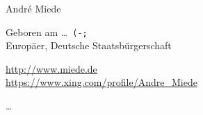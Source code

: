 \documentclass[10pt,a4paper]{scrartcl}
\begin{document}
    \pagestyle{plain}
    \begin{cv}{}
        \begin{cvlist}{}\label{PersDat}  %
            \item   Andr\'e Miede
            \item   Geboren am \dots\ \texttt{(-;} \\
                    Europ\"aer, Deutsche Staatsb\"urgerschaft
            \item   \url{http://www.miede.de} \\
                    \url{https://www.xing.com/profile/Andre_Miede}
        \end{cvlist}

        \clearpage
        \begin{cvlist}{}\label{irgendwas}
            \item   \dots
        \end{cvlist}
    \end{cv}
\end{document}
